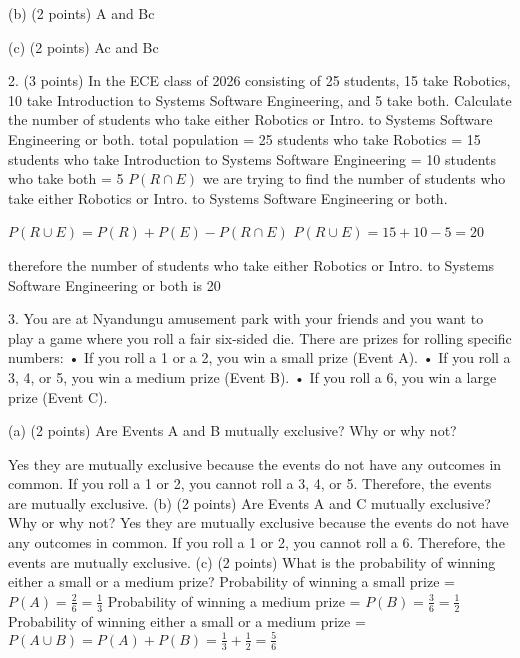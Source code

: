 \documentclass{article}
\begin{document}
(b) (2 points) A and Bc

(c) (2 points) Ac and Bc\newline

2. (3 points) In the ECE class of 2026 consisting of 25 students, 15 take Robotics, 10 take Introduction
to Systems Software Engineering, and 5 take both. Calculate the number of students who
take either Robotics or Intro. to Systems Software Engineering or both.\newline\newline
total population = 25\newline
students who take Robotics = 15\newline
students who take Introduction to Systems Software Engineering = 10\newline
students who take both = 5 \(P(R \cap E)\)\newline
we are trying to find the number of students who take either Robotics or Intro. to Systems Software Engineering or both.\newline

\(P(R \cup E ) = P(R) + P(E) - P(R \cap E)\)\newline
\(P(R \cup E ) = 15 + 10 - 5 = 20\)\newline

therefore the number of students who take either Robotics or Intro. to Systems Software Engineering or both is 20\newline

3. You are at Nyandungu amusement park with your friends and you want to play a game where you
roll a fair six-sided die. There are prizes for rolling specific numbers:\newline
• If you roll a 1 or a 2, you win a small prize (Event A).\newline
• If you roll a 3, 4, or 5, you win a medium prize (Event B).\newline
• If you roll a 6, you win a large prize (Event C).\newline

(a) (2 points) Are Events A and B mutually exclusive? Why or why not?

Yes they are mutually exclusive because the events do not have any outcomes in common. If you roll a 1 or 2, you cannot roll a 3, 4, or 5. Therefore, the events are mutually exclusive.\newline
(b) (2 points) Are Events A and C mutually exclusive? Why or why not?
Yes they are mutually exclusive because the events do not have any outcomes in common. If you roll a 1 or 2, you cannot roll a 6. Therefore, the events are mutually exclusive.\newline
(c) (2 points) What is the probability of winning either a small or a medium prize?
Probability of winning a small prize = \(P(A) = \frac{2}{6} = \frac{1}{3}\)\newline
Probability of winning a medium prize = \(P(B) = \frac{3}{6} = \frac{1}{2}\)\newline
Probability of winning either a small or a medium prize = \(P(A \cup B) = P(A) + P(B) = \frac{1}{3} + \frac{1}{2} = \frac{5}{6}\)\newline
\end{document}
